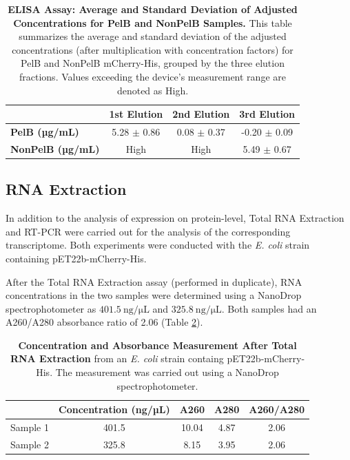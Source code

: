 \documentclass[a4paper,12pt]{article}
\begin{document}
\begin{table}[h!]
    \centering
    \caption{\textbf{ELISA Assay: Average and Standard Deviation of Adjusted Concentrations for PelB and NonPelB Samples.} This table summarizes the average and standard deviation of the adjusted concentrations (after multiplication with concentration factors) for PelB and NonPelB mCherry-His, grouped by the three elution fractions. Values exceeding the device's measurement range are denoted as High.}
    \begin{tabular}{lccc}
        & \textbf{1st Elution} & \textbf{2nd Elution} & \textbf{3rd Elution}\\
        \hline
        \textbf{PelB (µg/mL)} & 5.28 $\pm$ 0.86 & 0.08 $\pm$ 0.37 & -0.20 $\pm$ 0.09 \\
        \textbf{NonPelB (µg/mL)} & High  & High & 5.49 $\pm$ 0.67  \\
        \hline
    \end{tabular}
    \label{tab:elisa3}
\end{table}

\subsection{RNA Extraction}
In addition to the analysis of expression on protein-level, Total RNA Extraction and RT-PCR were carried out for the analysis of the corresponding transcriptome. Both experiments were conducted with the \emph{E. coli} strain containing pET22b-mCherry-His. 

After the Total RNA Extraction assay (performed in duplicate), RNA concentrations in the two samples were determined using a NanoDrop spectrophotometer as $\SI{401.5}{\nano\gram\per\micro\liter}$ and $\SI{325.8}{\nano\gram\per\micro\liter}$. Both samples had an A260/A280 absorbance ratio of 2.06 (Table \ref{tab:rna1}). 

\begin{table}[h!]
\centering
\caption{\textbf{Concentration and Absorbance Measurement After Total RNA Extraction} from an \emph{E. coli} strain containg pET22b-mCherry-His. The measurement was carried out using a NanoDrop spectrophotometer. }
\begin{tabular}{lcccc}
    & \textbf{Concentration (ng/µL)} & \textbf{A260} & \textbf{A280} & \textbf{A260/A280} \\
    \hline
    Sample 1 & 401.5 & 10.04 & 4.87 & 2.06 \\
    Sample 2 & 325.8 & 8.15 & 3.95 & 2.06 
\end{tabular}
\label{tab:rna1}
\end{table}
\end{document}

